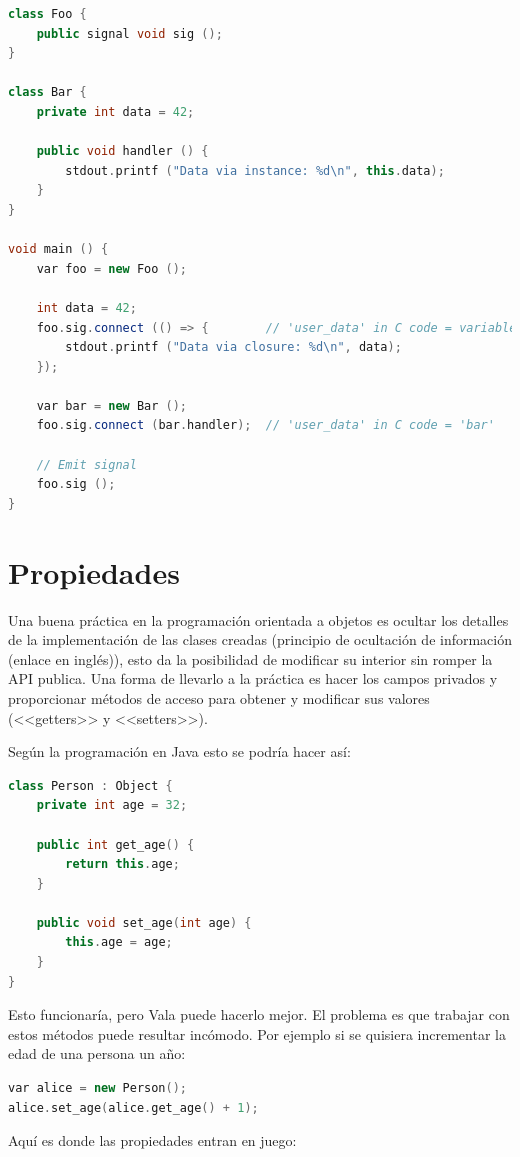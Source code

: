 \documentclass[12pt,twoside]{book}
\begin{document}
\begin{lstlisting}[language=C++]
class Foo {
	public signal void sig ();
}

class Bar {
	private int data = 42;
	
	public void handler () {
		stdout.printf ("Data via instance: %d\n", this.data);
	}
}

void main () {
	var foo = new Foo ();
	
	int data = 42;
	foo.sig.connect (() => {        // 'user_data' in C code = variables from outer context
		stdout.printf ("Data via closure: %d\n", data);
	});
	
	var bar = new Bar ();
	foo.sig.connect (bar.handler);  // 'user_data' in C code = 'bar'
	
	// Emit signal
	foo.sig ();
}
\end{lstlisting}


\section{Propiedades}

Una buena práctica en la programación orientada a objetos es ocultar los detalles de la implementación de las clases creadas (principio de ocultación de información (enlace en inglés)), esto da la posibilidad de modificar su interior sin romper la API publica. Una forma de llevarlo a la práctica es hacer los campos privados y proporcionar métodos de acceso para obtener y modificar sus valores (<<getters>> y <<setters>>).

Según la programación en Java esto se podría hacer así:

\begin{lstlisting}[language=C++]
class Person : Object {
	private int age = 32;
	
	public int get_age() {
		return this.age;
	}
	
	public void set_age(int age) {
		this.age = age;
	}
}
\end{lstlisting}

Esto funcionaría, pero Vala puede hacerlo mejor. El problema es que trabajar con estos métodos puede resultar incómodo. Por ejemplo si se quisiera incrementar la edad de una persona un año:

\begin{lstlisting}[language=C++]
var alice = new Person();
alice.set_age(alice.get_age() + 1);
\end{lstlisting}

Aquí es donde las propiedades entran en juego:
\end{document}
